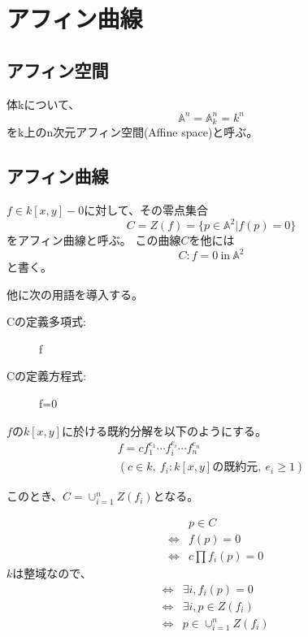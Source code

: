 \documentclass[a4]{article}
\newcommand{\affine}[1]{\mathbb{#1}}
\begin{document}
    \section{アフィン曲線}
        \subsection{アフィン空間}
        \begin{Def}
            体kについて、
            \[ \affine{A}^n=\affine{A}^n_{k}=k^n \]
            をk上のn次元アフィン空間(Affine space)と呼ぶ。
        \end{Def}

        \subsection{アフィン曲線}
        \begin{Def}
            $f \in k[x, y]-{0}$に対して、その零点集合
            \[ C=Z(f)=\{ p \in \affine{A}^2 | f(p)=0 \} \]
            をアフィン曲線と呼ぶ。
            この曲線$C$を他には
            \[ C:f=0 ~\mbox{in}~ \affine{A}^2 \]
            と書く。
        \end{Def}

        他に次の用語を導入する。
        \begin{description}
            \item[Cの定義多項式:] f
            \item[Cの定義方程式:] f=0
        \end{description}

        $f$の$k[x,y]$に於ける既約分解を以下のようにする。
        \begin{gather*}
            f=cf_1^{e_1} \dotsm f_i^{e_i} \dotsm f_n^{e_n} \\
            (c \in k,~ f_i : k[x, y]\mbox{の既約元},~ e_i \geq 1)
        \end{gather*}

        このとき、$C=\cup_{i=1}^{n}{Z(f_i)}$となる。

        \begin{Proof}
        \begin{eqnarray*}
            &{}&    p \in C \\
            &\iff&  f(p) =0 \\
            &\iff&  c \prod{f_i(p)}=0
        \end{eqnarray*}
            $k$は整域なので、
        \begin{eqnarray*}
            &\iff& \exists i, f_i(p)=0 \\
            &\iff& \exists i, p \in Z(f_i) \\
            &\iff& p \in \cup_{i=1}^{n}{Z(f_i)}
        \end{eqnarray*}

        \QED
        \end{Proof}
\end{document}
